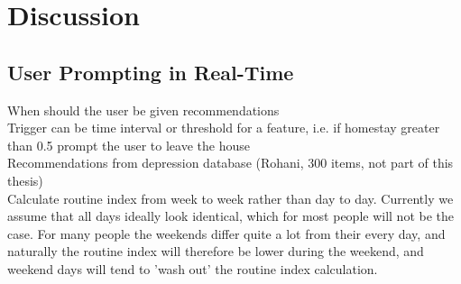 \chapter{Discussion}
\label{chapter:07}





\section{User Prompting in Real-Time}
When should the user be given recommendations\\
Trigger can be time interval or threshold for a feature, i.e. if homestay greater than 0.5 prompt the user to leave the house\\
Recommendations from depression database (Rohani, 300 items, not part of this thesis)\\

Calculate routine index from week to week rather than day to day. Currently we assume that all days ideally look identical, which for most people will not be the case. For many people the weekends differ quite a lot from their every day, and naturally the routine index will therefore be lower during the weekend, and weekend days will tend to 'wash out' the routine index calculation. 